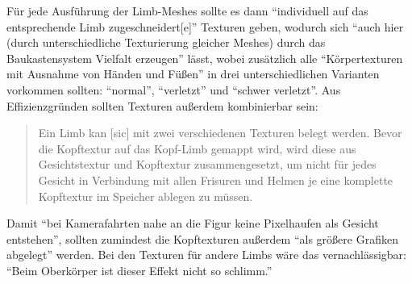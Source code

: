 \documentclass[a5paper,pagesize,numbers=noenddot]{scrbook}
\begin{document}
Für jede Ausführung der Limb-Meshes sollte es dann \enquote{individuell auf das entsprechende Limb zugeschneidert[e]} Texturen geben, wodurch sich \enquote{auch hier (durch unterschiedliche Texturierung gleicher Meshes) durch das Baukastensystem Vielfalt erzeugen} lässt, wobei zusätzlich alle \enquote{Körpertexturen mit Ausnahme von Händen und Füßen} in drei unterschiedlichen Varianten vorkommen sollten: \enquote{normal}, \enquote{verletzt} und \enquote{schwer verletzt}.
Aus Effizienzgründen sollten Texturen außerdem kombinierbar sein:

\begin{quote}
   Ein Limb kan [sic] mit zwei verschiedenen Texturen belegt werden.
   Bevor die Kopftextur auf das Kopf-Limb gemappt wird, wird diese aus Gesichtstextur und Kopftextur zusammengesetzt, um nicht für jedes Gesicht in Verbindung mit allen Frisuren und Helmen je eine komplette Kopftextur im Speicher ablegen zu müssen.
\end{quote}

Damit \enquote{bei Kamerafahrten nahe an die Figur keine Pixelhaufen als Gesicht entstehen}, sollten zumindest die Kopftexturen außerdem \enquote{als größere Grafiken abgelegt} werden.
Bei den Texturen für andere Limbs wäre das vernachlässigbar: \enquote{Beim Oberkörper ist dieser Effekt nicht so schlimm.}


\end{document}
